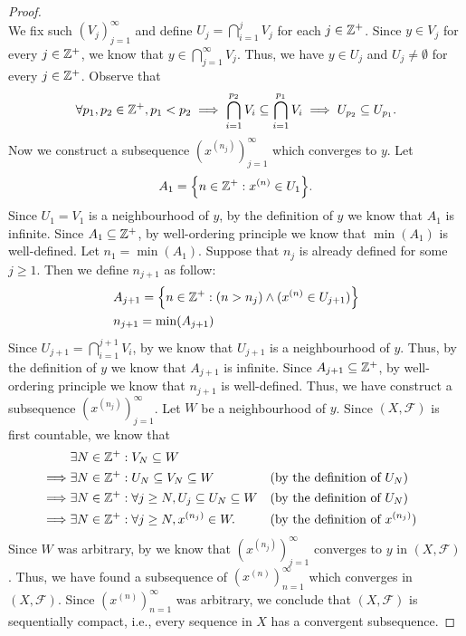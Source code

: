 \begin{proof}
\[  \]
  We fix such \((V_j)_{j = 1}^\infty\) and define \(U_j = \bigcap_{i = 1}^j V_j\) for each \(j \in \mathbb{Z}^+\).
  Since \(y \in V_j\) for every \(j \in \mathbb{Z}^+\), we know that \(y \in \bigcap_{j = 1}^\infty V_j\).
  Thus, we have \(y \in U_j\) and \(U_j \neq \emptyset\) for every \(j \in \mathbb{Z}^+\).
  Observe that
  \[
    \forall p_1, p_2 \in \mathbb{Z}^+, p_1 < p_2 \implies \bigcap_{i = 1}^{p_2} V_i \subseteq \bigcap_{i = 1}^{p_1} V_i \implies U_{p_2} \subseteq U_{p_1}.
  \]
  Now we construct a subsequence \((x^{(n_j)})_{j = 1}^\infty\) which converges to \(y\).
  Let
  \[
    A_1 = \set{n \in \Z^+ : x^{(n)} \in U_1}.
  \]
  Since \(U_1 = V_1\) is a neighbourhood of \(y\), by the definition of \(y\) we know that \(A_1\) is infinite.
  Since \(A_1 \subseteq \mathbb{Z}^+\), by well-ordering principle we know that \(\min(A_1)\) is well-defined.
  Let \(n_1 = \min(A_1)\).
  Suppose that \(n_j\) is already defined for some \(j \geq 1\).
  Then we define \(n_{j + 1}\) as follow:
  \begin{align*}
     & A_{j + 1} = \left\lbrace n \in \mathbb{Z}^+ : (n > n_j) \land (x^{(n)} \in U_{j + 1})\right\rbrace \\
     & n_{j + 1} = \min(A_{j + 1})
  \end{align*}
  Since \(U_{j + 1} = \bigcap_{i = 1}^{j + 1} V_i\), by  we know that \(U_{j + 1}\) is a neighbourhood of \(y\).
  Thus, by the definition of \(y\) we know that \(A_{j + 1}\) is infinite.
  Since \(A_{j + 1} \subseteq \mathbb{Z}^+\), by well-ordering principle we know that \(n_{j + 1}\) is well-defined.
  Thus, we have construct a subsequence \((x^{(n_j)})_{j = 1}^\infty\).
  Let \(W\) be a neighbourhood of \(y\).
  Since \((X, \mathcal{F})\) is first countable, we know that
  \begin{align*}
             & \exists N \in \mathbb{Z}^+ : V_N \subseteq W                                                                                  \\
    \implies & \exists N \in \mathbb{Z}^+ : U_N \subseteq V_N \subseteq W                   &  & \text{(by the definition of \(U_N\))}       \\
    \implies & \exists N \in \mathbb{Z}^+ : \forall j \geq N, U_j \subseteq U_N \subseteq W &  & \text{(by the definition of \(U_N\))}       \\
    \implies & \exists N \in \mathbb{Z}^+ : \forall j \geq N, x^{(n_j)} \in W.              &  & \text{(by the definition of \(x^{(n_j)}\))}
  \end{align*}
  Since \(W\) was arbitrary, by  we know that \((x^{(n_j)})_{j = 1}^\infty\) converges to \(y\) in \((X, \mathcal{F})\).
  Thus, we have found a subsequence of \((x^{(n)})_{n = 1}^\infty\) which converges in \((X, \mathcal{F})\).
  Since \((x^{(n)})_{n = 1}^\infty\) was arbitrary, we conclude that \((X, \mathcal{F})\) is sequentially compact, i.e., every sequence in \(X\) has a convergent subsequence.
\end{proof}

